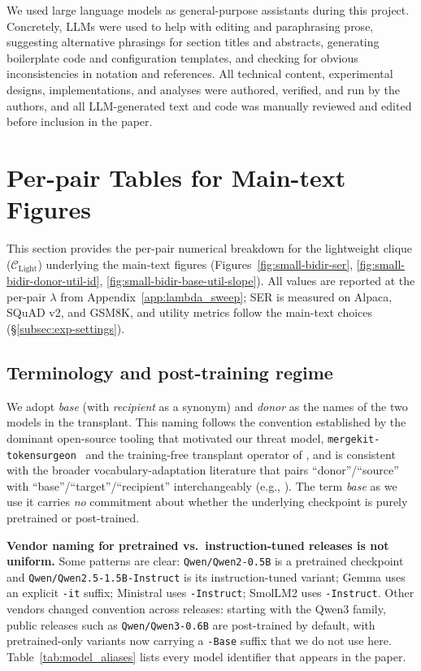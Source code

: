 \documentclass{article}
\theoremstyle{plain}
\theoremstyle{definition}
\theoremstyle{remark}
\begin{document}
We used large language models as general-purpose assistants during this project. Concretely, LLMs were used to help with editing and paraphrasing prose, suggesting alternative phrasings for section titles and abstracts, generating boilerplate code and configuration templates, and checking for obvious inconsistencies in notation and references. All technical content, experimental designs, implementations, and analyses were authored, verified, and run by the authors, and all LLM-generated text and code was manually reviewed and edited before inclusion in the paper. 



\section{Per-pair Tables for Main-text Figures}
\label{app:main_tables}

This section provides the per-pair numerical breakdown for the lightweight clique ($\mathcal{C}_{\text{Light}}$) underlying the main-text figures (Figures~\ref{fig:small-bidir-ser}, \ref{fig:small-bidir-donor-util-id}, \ref{fig:small-bidir-base-util-slope}). All values are reported at the per-pair $\lambda$ from Appendix~\ref{app:lambda_sweep}; SER is measured on Alpaca, SQuAD v2, and GSM8K, and utility metrics follow the main-text choices (\S\ref{subsec:exp-settings}).

\subsection{Terminology and post-training regime}
\label{app:terminology}

We adopt \emph{base} (with \emph{recipient} as a synonym) and \emph{donor} as the names of the two models in the transplant. This naming follows the convention established by the dominant open-source tooling that motivated our threat model, \texttt{mergekit-tokensurgeon}~\citep{mergekit2024} and the training-free transplant operator of \citet{goddard2025tftransplant}, and is consistent with the broader vocabulary-adaptation literature that pairs ``donor''/``source'' with ``base''/``target''/``recipient'' interchangeably (e.g., \citep{minixhofer2021wechsel,dobler2023focus,ostendorff2023efficient}). The term \emph{base} as we use it carries \emph{no} commitment about whether the underlying checkpoint is purely pretrained or post-trained.

\noindent\textbf{Vendor naming for pretrained vs.\ instruction-tuned releases is not uniform.}
Some patterns are clear: \texttt{Qwen/Qwen2-0.5B} is a pretrained checkpoint and \texttt{Qwen/Qwen2.5-1.5B-Instruct} is its instruction-tuned variant; Gemma uses an explicit \texttt{-it} suffix; Ministral uses \texttt{-Instruct}; SmolLM2 uses \texttt{-Instruct}. Other vendors changed convention across releases: starting with the Qwen3 family, public releases such as \texttt{Qwen/Qwen3-0.6B} are post-trained by default, with pretrained-only variants now carrying a \texttt{-Base} suffix that we do not use here. Table~\ref{tab:model_aliases} lists every model identifier that appears in the paper.
\end{document}
